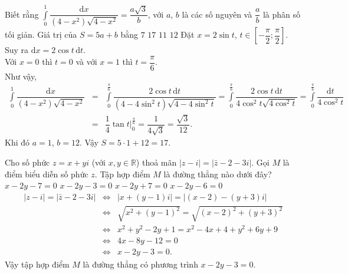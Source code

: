 \begin{ex}%
 Biết rằng $\displaystyle\int\limits_0^1 \dfrac{\mathrm{d}x}{(4-x^2)\sqrt{4-x^2}} =\dfrac{a\sqrt{3}}{b}$, với $a$, $b$ là các số nguyên và $\dfrac{a}{b}$ là phân số tối giản. Giá trị của $S = 5a + b$ bằng
 \choice
  {$7$}
  {\True $17$}
  {$11$}
  {$12$}
 \loigiai
  {
  Đặt $x=2\sin t$, $t \in \left[-\dfrac{\pi}{2}; \dfrac{\pi}{2}\right]$. Suy ra $\mathrm{d}x = 2\cos t \mathrm{\,d}t$.\\
  Với $x = 0$ thì $t = 0$ và với $x = 1$ thì $t = \dfrac{\pi}{6}$.\\
  Như vậy,
  \begin{eqnarray*}
   \displaystyle\int\limits_0^1 \dfrac{\mathrm{d}x}{(4-x^2)\sqrt{4-x^2}} &=& \displaystyle\int\limits_0^{\frac{\pi}{6}} \dfrac{2\cos t \mathrm{\,d}t}{(4-4\sin^2 t)\sqrt{4-4\sin^2 t}} = \displaystyle\int\limits_0^{\frac{\pi}{6}} \dfrac{2 \cos t \mathrm{\,d}t}{4\cos^2 t \sqrt{4\cos^2 t}} = \displaystyle\int\limits_0^{\frac{\pi}{6}} \dfrac{\mathrm{d}t}{4\cos^2 t}\\
   &=& \dfrac{1}{4}\tan t\bigg|_0^{\frac{\pi}{6}} = \dfrac{1}{4\sqrt{3}} = \dfrac{\sqrt{3}}{12}.
  \end{eqnarray*}
  Khi đó $a = 1$, $b = 12$. Vậy $S = 5 \cdot 1 + 12 = 17$.
  }
\end{ex}


\begin{ex}%
 Cho số phức $z=x+yi$ (với $x, y\in \mathbb{R}$) thoả mãn $\left|z-i\right| = \left|\bar{z}-2-3i\right|$. Gọi $M$ là điểm biểu diễn số phức $z$. Tập hợp điểm $M$ là đường thẳng nào dưới đây?
 \choice
  {$x - 2y - 7 = 0$}
  {\True $x - 2y - 3 = 0$}
  {$x - 2y + 7 = 0$}
  {$x - 2y - 6 = 0$}
 \loigiai
  {
  \begin{eqnarray*}
   \left|z-i\right| = \left|\bar{z}-2-3i\right| &\Leftrightarrow & \left|x + (y-1)i\right| = \left|(x-2) - (y+3)i\right|\\
   &\Leftrightarrow & \sqrt{x^2 + (y-1)^2} = \sqrt{(x-2)^2 + (y+3)^2}\\
   &\Leftrightarrow & x^2 + y^2 - 2y + 1 = x^2 - 4x + 4 + y^2 + 6y + 9\\
   &\Leftrightarrow & 4x - 8y - 12 = 0\\
   &\Leftrightarrow & x - 2y - 3 = 0.
  \end{eqnarray*}
  Vậy tập hợp điểm $M$ là đường thẳng có phương trình $x - 2y - 3 = 0$.
  }
\end{ex}


